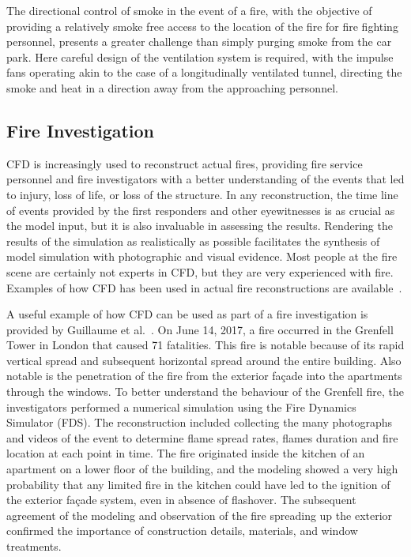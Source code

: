 \documentclass[graybox]{svmult}
\begin{document}
The directional control of smoke in the event of a fire, with the objective of providing a relatively smoke free access to the location of the fire for fire fighting personnel, presents a greater challenge than simply purging smoke from the car park. Here careful design of the ventilation system is required, with the impulse fans operating akin to the case of a longitudinally ventilated tunnel, directing the smoke and heat in a direction away from the approaching personnel.



\subsection{Fire Investigation}

CFD is increasingly used to reconstruct  actual  fires,  providing  fire  service  personnel and fire investigators with a better understanding of the events that led to injury, loss of life, or loss of the structure. In any reconstruction, the time line of events provided by the first responders and other eyewitnesses is as crucial as the model input, but it is also invaluable in assessing the results. Rendering the results of the simulation as realistically as possible facilitates the synthesis of model simulation with photographic and visual evidence. Most people at the fire scene are certainly not experts in CFD, but they are very experienced with fire. Examples of how CFD has been used in actual fire reconstructions are available~\cite{Grosshandler, McGrattan:2005, Madrzykowski:2000, Madrzykowski:2004, Christensen}.

A useful example of how CFD can be used as part of a fire investigation is provided by Guillaume et al.~\cite{Guillaume:FM_Part_1,Guillaume:FM_Part_2,Guillaume:FM_Part_3,Guillaume:FM_Part_4}. On June 14, 2017, a fire occurred in the Grenfell Tower in London that caused 71 fatalities. This fire is notable because of its rapid vertical spread and subsequent horizontal spread around the entire building. Also notable is the penetration of the fire from the exterior fa\c{c}ade into the apartments through the windows. To better understand the behaviour of the Grenfell fire, the investigators performed a numerical simulation using the Fire Dynamics Simulator (FDS).  The reconstruction included collecting the many photographs and videos of the event to determine flame spread rates, flames duration and fire location at each point in time. The fire originated inside the kitchen of an apartment on a lower floor of the building, and the modeling showed a very high probability that any limited fire in the kitchen could have led to the ignition of the exterior fa\c{c}ade system, even in absence of flashover. The subsequent agreement of the modeling and observation of the fire spreading up the exterior confirmed the importance of construction details, materials, and window treatments.
\end{document}
